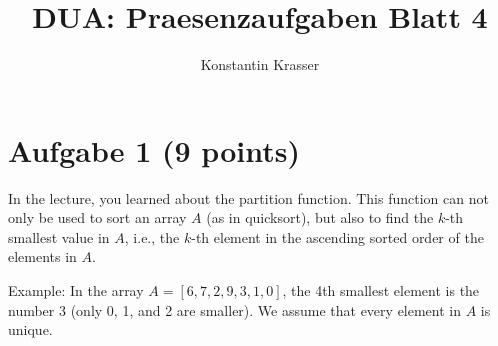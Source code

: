 \documentclass[11pt]{article}
\begin{document}
\author{Konstantin Krasser}
\title{DUA: Praesenzaufgaben Blatt 4}
\maketitle

\medskip

\section*{Aufgabe 1 (9 points)}

In the lecture, you learned about the partition function. This function can not only be used to sort an array $A$ (as in quicksort), but also to find the $k$-th smallest value in $A$, i.e., the $k$-th element in the ascending sorted order of the elements in $A$.

Example: In the array $A=[6,7,2,9,3,1,0]$, the 4th smallest element is the number 3 (only 0, 1, and 2 are smaller). We assume that every element in $A$ is unique.
\end{document}
